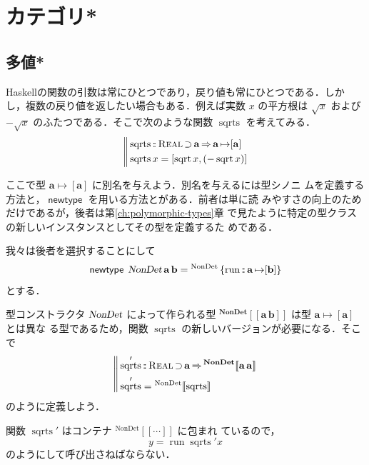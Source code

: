 \documentclass[a5paper,twoside,fleqn,draft]{jsbook}
\def\[{[\![}
\def\]{]\!]}
\newcommand{\programminglanguage}[1]{\textsf{#1}}
\newcommand{\haskell}{\programminglanguage{Haskell}}
\newcommand{\mBrace}{\Vert}
\newcommand{\mKeyword}[1]{\mathsf{#1}}
\newcommand{\mNewTypeDeclKeyword}{\mKeyword{newtype}}
\DeclareMathOperator{\mNewTypeDecl}{\mNewTypeDeclKeyword}
\DeclareMathOperator{\mSuperClass}{\Rightarrow}
\DeclareMathOperator{\mSuperSet}{\supset}
\newcommand{\mSpecialFunc}[1]{#1}
\DeclareMathOperator{\mRun}{\mSpecialFunc{run}}
\DeclareMathOperator{\mSqrt}{\mSpecialFunc{sqrt}}
\DeclareMathOperator{\mSqrts}{\mSpecialFunc{sqrts}}
\DeclareMathOperator{\mFuncArrow}{\mapsto}
\DeclareMathOperator{\mIn}{{:\!:}}
\newcommand{\mType}[1]{\mathbf{#1}} %
\newcommand{\mA}{\mType{a}}
\newcommand{\mB}{\mType{b}}
\newcommand{\mTypeAssemble}[2]{{}^\mType{#1}\[\mType{#2}\]}
\newcommand{\mTypeConstructor}[1]{\textsl{#1}}
\newcommand{\mValueConstructor}[1]{\mathrm{#1}}
\newcommand{\mValueWith}[2]{{}^\mValueConstructor{#1}\[#2\]}
\newcommand{\mValueRecordBeginWith}[1]{{}^\mValueConstructor{#1}\,\{}
\newcommand{\mValueRecordEnd}{\}}
\newcommand{\mValueRecordWith}[2]{\mValueRecordBeginWith{#1}{#2}\mValueRecordEnd}
\newcommand{\mTypeClass}[1]{\textsc{#1}} %
\newcommand{\mRealTypeClass}{\mTypeClass{Real}}
\begin{document}
\chapter{カテゴリ*}
\label{ch:category}

\section{多値*}

\haskell の関数の引数は常にひとつであり，戻り値も常にひとつである．しか
し，複数の戻り値を返したい場合もある．例えば実数 $x$ の平方根は
$\sqrt{x}$ および $-\sqrt{x}$ のふたつである．そこで次のような関数
$\mSqrts$ を考えてみる．
\begin{equation}
  \left\mBrace
  \begin{aligned}
    &\mSqrts\mIn{}\mRealTypeClass\mSuperSet\mA \mSuperClass
    \mA\mFuncArrow[\mA]\\
    &\mSqrts x=[\mSqrt x,(-\mSqrt x)]
  \end{aligned}
  \right.
\end{equation}

ここで型 $\mA\mFuncArrow[\mA]$ に別名を与えよう．別名を与えるには型シノニ
ムを定義する方法と，$\mNewTypeDecl$ を用いる方法とがある．前者は単に読
みやすさの向上のためだけであるが，後者は第\ref{ch:polymorphic-types}章
で見たように特定の型クラスの新しいインスタンスとしてその型を定義するた
めである．

我々は後者を選択することにして
\begin{equation}
  \mNewTypeDecl\;
  \mTypeConstructor{NonDet}\,\mA\,\mB
  =\mValueRecordWith{NonDet}{\mRun\mIn\mA\mFuncArrow[\mB]}
\end{equation}
とする．

型コンストラクタ $\mTypeConstructor{NonDet}$ によって作られる型
$\mTypeAssemble{NonDet}{\mA\,\mB}$ は型 $\mA\mFuncArrow[\mA]$ とは異な
る型であるため，関数 $\mSqrts$ の新しいバージョンが必要になる．そこで
\begin{equation}
  \left\mBrace
  \begin{aligned}
    &\mSqrts'
    \mIn\mRealTypeClass\mSuperSet\mA
    \mSuperClass\mTypeAssemble{NonDet}{\mA\,\mA}\\
    &\mSqrts'
    =\mValueWith{NonDet}{\mSqrts}
  \end{aligned}
  \right.
\end{equation}
のように定義しよう．

関数 $\mSqrts'$ はコンテナ $\mValueWith{NonDet}{\dotsb}$ に包まれ
ているので，
\begin{equation}
  y=\mRun\mSqrts'x
\end{equation}
のようにして呼び出さねばならない．
\end{document}
